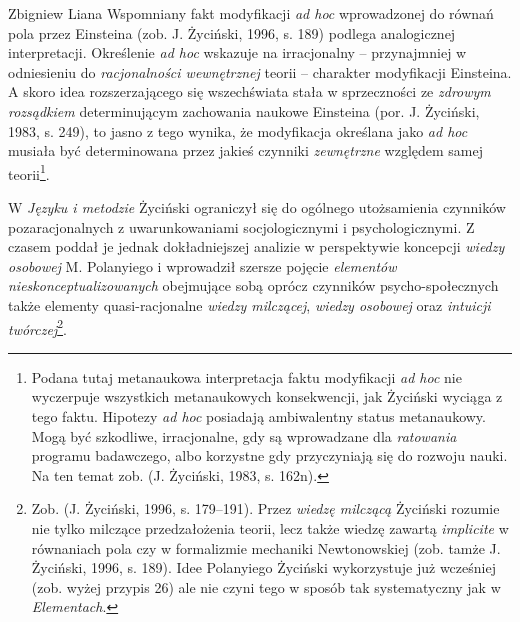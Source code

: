 \begin{artplenv}{Zbigniew Liana}
Wspomniany fakt modyfikacji \textit{ad hoc} wprowadzonej do równań pola przez Einsteina \label{ref:RNDuYYfgAN5No}(zob. J.
Życiński, 1996, s. 189) podlega analogicznej interpretacji. Określenie \textit{ad hoc} wskazuje na irracjonalny --
przynajmniej w odniesieniu do \textit{racjonalności wewnętrznej} teorii -- charakter modyfikacji Einsteina. A skoro idea
rozszerzającego się wszechświata stała w sprzeczności ze \textit{zdrowym rozsądkiem} determinującym zachowania naukowe
Einsteina \label{ref:RNDcdQNYoHSWz}(por. J. Życiński, 1983, s. 249), to jasno z tego wynika, że modyfikacja określana
jako \textit{ad hoc} musiała być determinowana przez jakieś czynniki \textit{zewnętrzne} względem samej
teorii\footnote{Podana tutaj metanaukowa interpretacja faktu modyfikacji \textit{ad hoc} nie wyczerpuje wszystkich
metanaukowych konsekwencji, jak Życiński wyciąga z tego faktu. Hipotezy \textit{ad hoc} posiadają ambiwalentny status
metanaukowy. Mogą być szkodliwe, irracjonalne, gdy są wprowadzane dla \textit{ratowania} programu badawczego, albo
korzystne gdy przyczyniają się do rozwoju nauki. Na ten temat zob. \label{ref:RNDbdDBcwL7tT}(J. Życiński, 1983, s. 162n).}.

W \textit{Języku i metodzie} Życiński ograniczył się do ogólnego utożsamienia czynników pozaracjonalnych z uwarunkowaniami
socjologicznymi i psychologicznymi. Z czasem poddał je jednak dokładniejszej analizie w perspektywie koncepcji
\textit{wiedzy osobowej} M. Polanyiego i wprowadził szersze pojęcie \textit{elementów nieskonceptualizowanych} obejmujące
sobą oprócz czynników psycho-społecznych także elementy quasi-racjonalne \textit{wiedzy milczącej}, \textit{wiedzy osobowej}
oraz \textit{intuicji twórczej}\footnote{Zob. \label{ref:RNDTM62j2cxS8}(J. Życiński, 1996, s. 179–191). Przez
\textit{wiedzę milczącą} Życiński rozumie nie tylko milczące przedzałożenia teorii, lecz także wiedzę zawartą
\textit{implicite} w równaniach pola czy w formalizmie mechaniki Newtonowskiej \label{ref:RNDBBgSxRheRf}(zob. tamże J.
Życiński, 1996, s. 189). Idee Polanyiego Życiński wykorzystuje już wcześniej (zob. wyżej przypis 26) ale nie czyni
tego w sposób tak systematyczny jak w \textit{Elementach}.}.


\end{artplenv}
